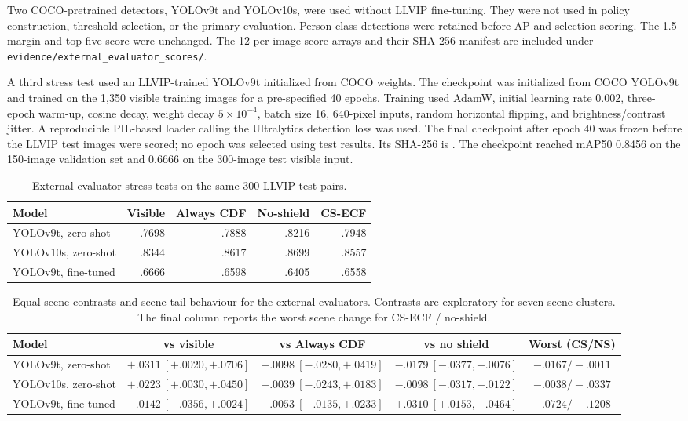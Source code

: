 \documentclass[11pt]{article}
\begin{document}
Two COCO-pretrained detectors, YOLOv9t and YOLOv10s, were used without LLVIP
fine-tuning. They were not used in policy construction, threshold selection, or
the primary evaluation. Person-class detections were retained before AP and
selection scoring. The 1.5 margin and top-five score were unchanged.
The 12 per-image score arrays and their SHA-256 manifest are included under
\texttt{evidence/external\_evaluator\_scores/}.

A third stress test used an LLVIP-trained YOLOv9t initialized from COCO
weights. The checkpoint was
initialized from COCO YOLOv9t and trained on the 1,350 visible training images
for a pre-specified 40 epochs. Training used AdamW, initial learning rate
0.002, three-epoch warm-up, cosine decay, weight decay \(5\times10^{-4}\), batch
size 16, 640-pixel inputs, random horizontal flipping, and
brightness/contrast jitter. A reproducible PIL-based loader calling the
Ultralytics detection loss was used. The final checkpoint after epoch 40 was
frozen before the LLVIP test images were scored; no epoch was selected using
test results. Its SHA-256 is
\texttt{}.
The checkpoint reached mAP50 0.8456 on the 150-image validation set and 0.6666
on the 300-image test visible input.

\begin{table}[ht]
\centering
\small
\caption{External evaluator stress tests on the same 300 LLVIP test pairs.}
\begin{tabular}{@{}lrrrr@{}}
\toprule
Model & Visible & Always CDF & No-shield & CS-ECF \\
\midrule
YOLOv9t, zero-shot & .7698 & .7888 & .8216 & .7948 \\
YOLOv10s, zero-shot & .8344 & .8617 & .8699 & .8557 \\
YOLOv9t, fine-tuned & .6666 & .6598 & .6405 & .6558 \\
\bottomrule
\end{tabular}
\end{table}

\begin{table}[ht]
\centering
\scriptsize
\setlength{\tabcolsep}{3pt}
\caption{Equal-scene contrasts and scene-tail behaviour for the external
evaluators. Contrasts are exploratory for seven scene clusters. The final
column reports the worst scene change for CS-ECF / no-shield.}
\begin{tabular}{@{}lcccc@{}}
\toprule
Model & vs visible & vs Always CDF & vs no shield & Worst (CS/NS) \\
\midrule
YOLOv9t, zero-shot & \(+.0311~[+.0020,+.0706]\) &
  \(+.0098~[-.0280,+.0419]\) & \(-.0179~[-.0377,+.0076]\) &
  \(-.0167 / -.0011\) \\
YOLOv10s, zero-shot & \(+.0223~[+.0030,+.0450]\) &
  \(-.0039~[-.0243,+.0183]\) & \(-.0098~[-.0317,+.0122]\) &
  \(-.0038 / -.0337\) \\
YOLOv9t, fine-tuned & \(-.0142~[-.0356,+.0024]\) &
  \(+.0053~[-.0135,+.0233]\) & \(+.0310~[+.0153,+.0464]\) &
  \(-.0724 / -.1208\) \\
\bottomrule
\end{tabular}
\end{table}
\end{document}

